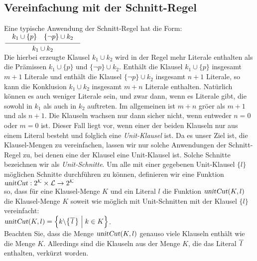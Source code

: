 \subsection{Vereinfachung mit der Schnitt-Regel}
Eine typische Anwendung der Schnitt-Regel hat die Form: \\[0.2cm]
\hspace*{1.3cm} $\schluss{ k_1 \cup \{p\} \quad \{\neg p\} \cup k_2}{k_1 \cup k_2}$
\\[0.2cm]
Die hierbei erzeugte Klausel $k_1 \cup k_2$ wird in der Regel mehr Literale enthalten
als die Pr\"{a}missen $k_1 \cup \{p\}$ und $\bigl\{\neg p\} \cup k_2$.  Enth\"{a}lt die
Klausel $k_1 \cup \{p\}$ insgesamt $m+1$ Literale und enth\"{a}lt die Klausel
$\bigl\{\neg p\} \cup k_2$ insgesamt $n+1$ Literale, so kann die Konklusion $k_1 \cup k_2$ 
insgesamt $m + n$ Literale enthalten.  Nat\"{u}rlich k\"{o}nnen es auch weniger Literale 
sein, und zwar dann, wenn es Literale gibt, die sowohl in $k_1$ als auch in $k_2$
auftreten.  Im allgemeinen ist $m + n$ gr\"{o}\3er als $m + 1$ und als $n + 1$.  Die
Klauseln wachsen nur dann sicher nicht, wenn entweder $n = 0$ oder $m = 0$ ist.
Dieser Fall liegt vor, wenn einer der beiden Klauseln nur aus einem Literal besteht
und folglich eine \emph{Unit-Klausel} ist.  Da es unser Ziel ist, die Klausel-Mengen
zu vereinfachen, lassen wir nur solche Anwendungen der Schnitt-Regel zu, bei denen
eine der Klausel eine Unit-Klausel ist.  Solche Schnitte bezeichnen wir als
\emph{Unit-Schnitte}.  Um alle mit einer gegebenen Unit-Klausel $\{l\}$ m\"{o}glichen Schnitte
durchf\"{u}hren zu k\"{o}nnen, definieren wir eine Funktion
\\[0.2cm]
\hspace*{1.3cm}
$\textsl{unitCut}: 2^\mathcal{K} \times \mathcal{L} \rightarrow 2^\mathcal{K}$
\\[0.2cm]
so, dass f\"{u}r eine Klausel-Menge $K$ und ein Literal $l$ die Funktion
$\textsl{unitCut}(K,l)$ die Klausel-Menge $K$ soweit wie m\"{o}glich mit Unit-Schnitten mit der Klausel
$\{l\}$ vereinfacht:
\\[0.2cm]
\hspace*{1.3cm}
$\textsl{unitCut}(K,l) = \Bigl\{ k \backslash \bigl\{ \overline{\,l\,} \bigr\} \;\Big|\; k \in K \Bigr\}$.
\\[0.2cm]
Beachten Sie, dass die Menge $\textsl{unitCut}(K,l)$ genauso viele Klauseln enth\"{a}lt wie die Menge
$K$.  Allerdings sind die Klauseln aus der Menge $K$, die das Literal $\overline{\,l\,}$
enthalten, verk\"{u}rzt worden. 

